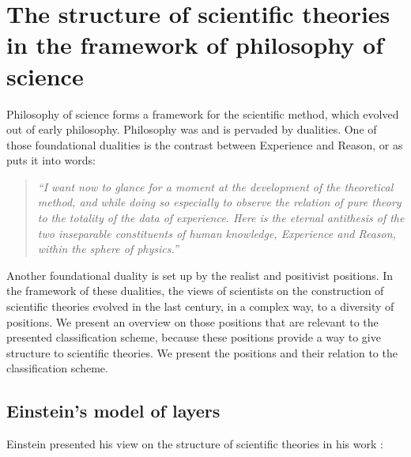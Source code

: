 \documentclass{article}
\begin{document}
\newpage

\section{The structure of scientific theories in the framework of philosophy of science}


Philosophy of science forms a framework for the scientific method, which evolved out of early philosophy. Philosophy was and is pervaded by dualities. One of those foundational dualities is the contrast between Experience and Reason, or as \cite[]{einstein1934method} puts it into words: 

\begin{quote}
\textit{``I want now to glance for a moment at the development of the theoretical method, and while doing so especially to observe the relation of pure theory to the totality of the data of experience. Here is the eternal antithesis of the two inseparable constituents of human knowledge, Experience and Reason, within the sphere
of physics.''}
\end{quote}

Another foundational duality is set up by the realist and positivist positions. In the framework of these dualities, the views of scientists on the construction of scientific theories evolved in the last century, in a complex way, to a diversity of positions. We present an overview on those positions that are relevant to the presented classification scheme, because these positions provide a way to give structure to scientific theories. We present the positions and their relation to the classification scheme. 



\subsection{Einstein's model of layers}

Einstein presented his view on the structure of scientific theories in his work \cite[]{einstein1936physik}: 
\end{document}
